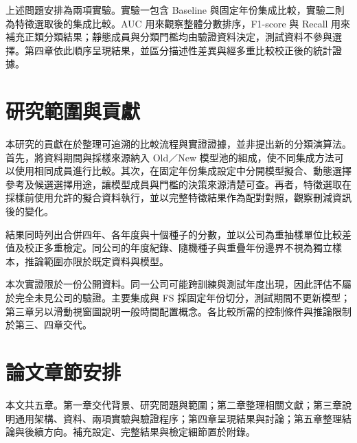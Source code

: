 上述問題安排為兩項實驗。實驗一包含 Baseline 與固定年份集成比較，實驗二則為特徵選取後的集成比較。AUC 用來觀察整體分數排序，F1-score 與 Recall 用來補充正類分類結果；靜態成員與分類門檻均由驗證資料決定，測試資料不參與選擇。第四章依此順序呈現結果，並區分描述性差異與經多重比較校正後的統計證據。

\section{研究範圍與貢獻}

本研究的貢獻在於整理可追溯的比較流程與實證證據，並非提出新的分類演算法。首先，將資料期間與採樣來源納入 Old／New 模型池的組成，使不同集成方法可以使用相同成員進行比較。其次，在固定年份集成設定中分開模型擬合、動態選擇參考及候選選擇用途，讓模型成員與門檻的決策來源清楚可查。再者，特徵選取在採樣前使用允許的擬合資料執行，並以完整特徵結果作為配對對照，觀察刪減資訊後的變化。

結果同時列出合併四年、各年度與十個種子的分數，並以公司為重抽樣單位比較差值及校正多重檢定。同公司的年度紀錄、隨機種子與重疊年份邊界不視為獨立樣本，推論範圍亦限於既定資料與模型。

本次實證限於一份公開資料。同一公司可能跨訓練與測試年度出現，因此評估不屬於完全未見公司的驗證。主要集成與 FS 採固定年份切分，測試期間不更新模型；第三章另以滑動視窗圖說明一般時間配置概念。各比較所需的控制條件與推論限制於第三、四章交代。

\section{論文章節安排}

本文共五章。第一章交代背景、研究問題與範圍；第二章整理相關文獻；第三章說明通用架構、資料、兩項實驗與驗證程序；第四章呈現結果與討論；第五章整理結論與後續方向。補充設定、完整結果與檢定細節置於附錄。
\endgroup
